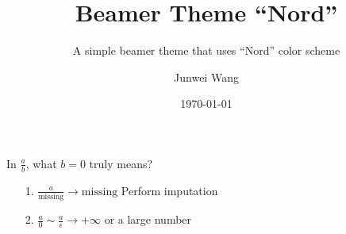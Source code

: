 \documentclass[compress]{beamer}
\title{Beamer Theme ``Nord''}
\subtitle{A simple beamer theme that uses ``Nord'' color scheme}
\author{Junwei Wang}
\institute{CryptoExperts}
\date{\today}
\begin{document}
\begin{frame}

In $\displaystyle\frac{a}{b}$, what \textcolor{NordOrange}{$b=0$} truly means?

\vspace{25pt}

\begin{itemize}

\item[1.] \hspace{3pt}
$
\displaystyle\frac{a}{\mathrm{missing}} \rightarrow \mathrm{missing}
$
\hspace{5pt} Perform imputation

\vspace{25pt}

\item[2.] \hspace{3pt}
$
\displaystyle\frac{a}{0} \sim \frac{a}{\epsilon}\rightarrow +\infty
$
\hspace{5pt} or a large number

\end{itemize}

\end{frame}










\end{document}
